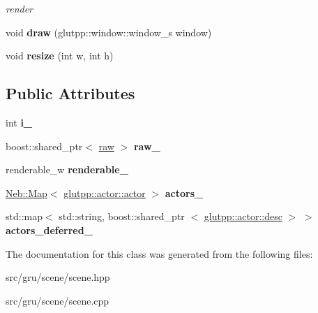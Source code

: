 \begin{DoxyCompactItemize}
\begin{DoxyCompactList}\small\item\em render \end{DoxyCompactList}\item 
\hypertarget{classglutpp_1_1scene_1_1scene_a9bbb023db7322d1aed04f9ae5c541222}{void {\bfseries draw} (glutpp\-::window\-::window\-\_\-s window)}\label{classglutpp_1_1scene_1_1scene_a9bbb023db7322d1aed04f9ae5c541222}

\item 
\hypertarget{classglutpp_1_1scene_1_1scene_aff3b39ef52ea118f99a2e02e3ff819d9}{void {\bfseries resize} (int w, int h)}\label{classglutpp_1_1scene_1_1scene_aff3b39ef52ea118f99a2e02e3ff819d9}

\end{DoxyCompactItemize}
\subsection*{\-Public \-Attributes}
\begin{DoxyCompactItemize}
\item 
\hypertarget{classglutpp_1_1scene_1_1scene_a928bc6e75e5521c28ccdd48f6b54da80}{int {\bfseries i\-\_\-}}\label{classglutpp_1_1scene_1_1scene_a928bc6e75e5521c28ccdd48f6b54da80}

\item 
\hypertarget{classglutpp_1_1scene_1_1scene_af1f1a94a434d3a0bb82fc0f30d663fab}{boost\-::shared\-\_\-ptr$<$ \hyperlink{classglutpp_1_1scene_1_1raw}{raw} $>$ {\bfseries raw\-\_\-}}\label{classglutpp_1_1scene_1_1scene_af1f1a94a434d3a0bb82fc0f30d663fab}

\item 
\hypertarget{classglutpp_1_1scene_1_1scene_ae7cb4b325dcdf8a43307927db29d8dcc}{renderable\-\_\-w {\bfseries renderable\-\_\-}}\label{classglutpp_1_1scene_1_1scene_ae7cb4b325dcdf8a43307927db29d8dcc}

\item 
\hypertarget{classglutpp_1_1scene_1_1scene_a006a66605a07cc4a08303e766de7def4}{\hyperlink{classNeb_1_1Map}{\-Neb\-::\-Map}$<$ \hyperlink{classglutpp_1_1actor_1_1actor}{glutpp\-::actor\-::actor} $>$ {\bfseries actors\-\_\-}}\label{classglutpp_1_1scene_1_1scene_a006a66605a07cc4a08303e766de7def4}

\item 
\hypertarget{classglutpp_1_1scene_1_1scene_afb5b377dfd9af31a3476ba4b3a721481}{std\-::map$<$ std\-::string, \*
boost\-::shared\-\_\-ptr\*
$<$ \hyperlink{classglutpp_1_1actor_1_1desc}{glutpp\-::actor\-::desc} $>$ $>$ {\bfseries actors\-\_\-deferred\-\_\-}}\label{classglutpp_1_1scene_1_1scene_afb5b377dfd9af31a3476ba4b3a721481}

\end{DoxyCompactItemize}


\-The documentation for this class was generated from the following files\-:\begin{DoxyCompactItemize}
\item 
src/gru/scene/scene.\-hpp\item 
src/gru/scene/scene.\-cpp\end{DoxyCompactItemize}
